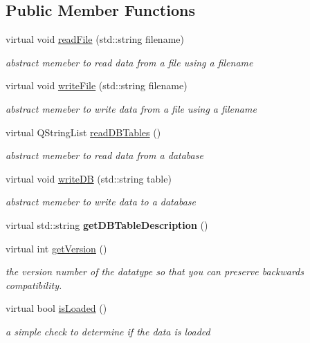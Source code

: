 \subsection*{Public Member Functions}
\begin{DoxyCompactItemize}
\item 
virtual void \hyperlink{classAbstractData_ab43309236fd644fd303b4b1468a87d86}{read\+File} (std\+::string filename)
\begin{DoxyCompactList}\small\item\em abstract memeber to read data from a file using a filename \end{DoxyCompactList}\item 
virtual void \hyperlink{classAbstractData_a338dce47a9901032fd7b908a1c6df514}{write\+File} (std\+::string filename)
\begin{DoxyCompactList}\small\item\em abstract memeber to write data from a file using a filename \end{DoxyCompactList}\item 
virtual Q\+String\+List \hyperlink{classAbstractData_af9276f9e783765db82c8a7150c0ec632}{read\+D\+B\+Tables} ()
\begin{DoxyCompactList}\small\item\em abstract memeber to read data from a database \end{DoxyCompactList}\item 
virtual void \hyperlink{classAbstractData_a6eaaee3b3926d9044649249e7b665c66}{write\+DB} (std\+::string table)
\begin{DoxyCompactList}\small\item\em abstract memeber to write data to a database \end{DoxyCompactList}\item 
virtual std\+::string {\bfseries get\+D\+B\+Table\+Description} ()\hypertarget{classAbstractData_a09d6d5beb359c704c58d41d9710a167f}{}\label{classAbstractData_a09d6d5beb359c704c58d41d9710a167f}

\item 
virtual int \hyperlink{classAbstractData_a11dc7c98def9fb8b2c622d9af63cdd0e}{get\+Version} ()
\begin{DoxyCompactList}\small\item\em the version number of the datatype so that you can preserve backwards compatibility. \end{DoxyCompactList}\item 
virtual bool \hyperlink{classAbstractData_a8524756b3b36642ab007296da748b6db}{is\+Loaded} ()
\begin{DoxyCompactList}\small\item\em a simple check to determine if the data is loaded \end{DoxyCompactList}\end{DoxyCompactItemize}
